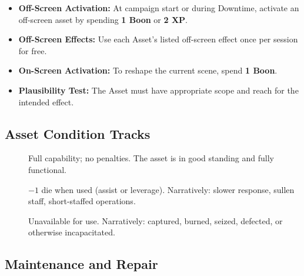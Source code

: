 \begin{itemize}
    \item \textbf{Off-Screen Activation:} At campaign start or during Downtime, activate an off-screen asset by spending \textbf{1 Boon} or \textbf{2 XP}. 
    \item \textbf{Off-Screen Effects:} Use each Asset's listed off-screen effect once per session for free. 
    \item \textbf{On-Screen Activation:} To reshape the current scene, spend \textbf{1 Boon}. 
    \item \textbf{Plausibility Test:} The Asset must have appropriate scope and reach for the intended effect. 
\end{itemize}

\subsection{Asset Condition Tracks}
\label{subsec:asset-conditions}

\begin{description}
\item[] Full capability; no penalties. The asset is in good standing and fully functional. 
\item[] $-1$ die when used (assist or leverage). Narratively: slower response, sullen staff, short-staffed operations. 
\item[] Unavailable for use. Narratively: captured, burned, seized, defected, or otherwise incapacitated. 
\end{description}

\subsection{Maintenance and Repair}
\label{subsec:asset-maintenance}

